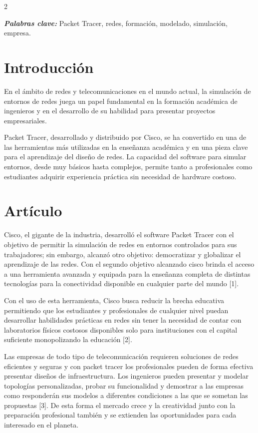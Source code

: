 \documentclass[12pt,spanish,Letterpaper,openany]{book}
\begin{document}
\begin {multicols}{2}

\textbf{\emph{Palabras clave:}} Packet Tracer, redes, formación, modelado, simulación, empresa.

\hypertarget{introducciuxf3n-5}{%
\section{Introducción}\label{introducciuxf3n-5}}

En el ámbito de redes y telecomunicaciones en el mundo actual, la simulación de entornos
de redes juega un papel fundamental en la formación académica de ingenieros y en el
desarrollo de su habilidad para presentar proyectos empresariales.

Packet Tracer, desarrollado y distribuido por Cisco, se ha convertido en una de las
herramientas más utilizadas en la enseñanza académica y en una pieza clave para el
aprendizaje del diseño de redes. La capacidad del software para simular entornos, desde muy
básicos hasta complejos, permite tanto a profesionales como estudiantes adquirir experiencia
práctica sin necesidad de hardware costoso.

\hypertarget{artuxedculo-5}{%
\section{Artículo}\label{artuxedculo-5}}

Cisco, el gigante de la industria, desarrolló el software Packet Tracer con el objetivo de
permitir la simulación de redes en entornos controlados para sus trabajadores; sin embargo,
alcanzó otro objetivo: democratizar y globalizar el aprendizaje de las redes. Con el segundo
objetivo alcanzado cisco brinda el acceso a una herramienta avanzada y equipada para la
enseñanza completa de distintas tecnologías para la conectividad disponible en cualquier
parte del mundo {[}1{]}.

Con el uso de esta herramienta, Cisco busca reducir la brecha educativa permitiendo que los
estudiantes y profesionales de cualquier nivel puedan desarrollar habilidades prácticas en
redes sin tener la necesidad de contar con laboratorios físicos costosos disponibles solo para
instituciones con el capital suficiente monopolizando la educación {[}2{]}.

Las empresas de todo tipo de telecomunicación requieren soluciones de redes eficientes y
seguras y con packet tracer los profesionales pueden de forma efectiva presentar diseños de
infraestructura. Los ingenieros pueden presentar y modelar topologías personalizadas, probar
su funcionalidad y demostrar a las empresas como responderán sus modelos a diferentes
condiciones a las que se sometan las propuestas {[}3{]}. De esta forma el mercado crece y la
creatividad junto con la preparación profesional también y se extienden las oportunidades
para cada interesado en el planeta.


\end{multicols}
\end{document}
